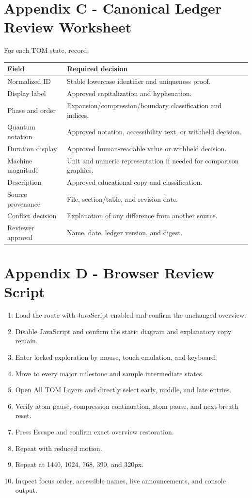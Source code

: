 \documentclass[11pt,letterpaper]{article}
\begin{document}
\section{Appendix C - Canonical Ledger Review Worksheet}
For each TOM state, record:
\begin{longtable}{L{1.65in}L{4.75in}}
\toprule
\textbf{Field} & \textbf{Required decision} \\
\midrule
Normalized ID & Stable lowercase identifier and uniqueness proof. \\
Display label & Approved capitalization and hyphenation. \\
Phase and order & Expansion/compression/boundary classification and indices. \\
Quantum notation & Approved notation, accessibility text, or withheld decision. \\
Duration display & Approved human-readable value or withheld decision. \\
Machine magnitude & Unit and numeric representation if needed for comparison graphics. \\
Description & Approved educational copy and classification. \\
Source provenance & File, section/table, and revision date. \\
Conflict decision & Explanation of any difference from another source. \\
Reviewer approval & Name, date, ledger version, and digest. \\
\bottomrule
\end{longtable}

\section{Appendix D - Browser Review Script}
\begin{enumerate}
\item Load the route with JavaScript enabled and confirm the unchanged overview.
\item Disable JavaScript and confirm the static diagram and explanatory copy remain.
\item Enter locked exploration by mouse, touch emulation, and keyboard.
\item Move to every major milestone and sample intermediate states.
\item Open All TOM Layers and directly select early, middle, and late entries.
\item Verify atom pause, compression continuation, ztom pause, and next-breath reset.
\item Press Escape and confirm exact overview restoration.
\item Repeat with reduced motion.
\item Repeat at 1440, 1024, 768, 390, and 320px.
\item Inspect focus order, accessible names, live announcements, and console output.
\end{enumerate}
\end{document}
